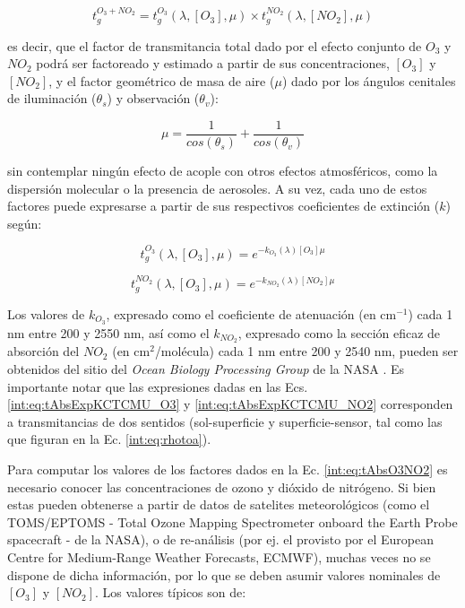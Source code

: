     \begin{equation}
        t_{g}^{O_{3} + NO_{2}} = t_{g}^{O_{3}}(\lambda,[O_{3}],\mu) \times t_{g}^{NO_{2}}(\lambda,[NO_{2}],\mu)
        \label{int:eq:tAbsO3NO2}
    \end{equation}

    \noindent es decir, que el factor de transmitancia total dado por el efecto conjunto de $O_{3}$ y $NO_{2}$ podrá ser factoreado y estimado a partir de sus concentraciones, $[O_{3}]$ y $[NO_{2}]$, y el factor geométrico de masa de aire ($\mu$) dado por los ángulos cenitales de iluminación ($\theta_{s}$) y observación ($\theta_{v}$):
    
    \begin{equation}
        \mu = \frac{1}{cos(\theta_{s})} + \frac{1}{cos(\theta_{v})}
        \label{int:eq:mu}
    \end{equation}

    \noindent sin contemplar ningún efecto de acople con otros efectos atmosféricos, como la dispersión molecular o la presencia de aerosoles. A su vez, cada uno de estos factores puede expresarse a partir de sus respectivos coeficientes de extinción ($k$) según:

    \begin{equation}
        t_{g}^{O_{3} }(\lambda,[O_{3}],\mu) = e^{-k_{O_{3} }(\lambda)[O_{3} ]\mu}
        \label{int:eq:tAbsExpKCTCMU_O3}
    \end{equation}

    \begin{equation}
        t_{g}^{NO_{2}}(\lambda,[O_{3}],\mu) = e^{-k_{NO_{2}}(\lambda)[NO_{2}]\mu}
        \label{int:eq:tAbsExpKCTCMU_NO2}
    \end{equation}
    
    Los valores de $k_{O_{3}}$, expresado como el coeficiente de atenuación (en cm$^{-1}$) cada 1 nm entre 200 y 2550 nm, así como el $k_{NO_{2}}$, expresado como la sección eficaz de absorción del $NO_{2}$ (en cm$^{2}$/molécula) cada 1 nm entre 200 y 2540 nm, pueden ser obtenidos del sitio del \textit{Ocean Biology Processing Group} de la NASA \cite{obpg}. Es importante notar que las expresiones dadas en las Ecs. \ref{int:eq:tAbsExpKCTCMU_O3} y \ref{int:eq:tAbsExpKCTCMU_NO2} corresponden a transmitancias de dos sentidos (sol-superficie y superficie-sensor, tal como las que figuran en la Ec. \ref{int:eq:rhotoa}).
    
    Para computar los valores de los factores dados en la Ec. \ref{int:eq:tAbsO3NO2} es necesario conocer las concentraciones de ozono y dióxido de nitrógeno. Si bien estas pueden obtenerse a partir de datos de satelites meteorológicos (como el TOMS/EPTOMS - Total Ozone Mapping Spectrometer onboard the Earth Probe spacecraft - de la NASA), o de re-análisis (por ej. el provisto por el European Centre for Medium-Range Weather Forecasts, ECMWF), muchas veces no se dispone de dicha información, por lo que se deben asumir valores nominales de $[O_{3}]$ y $[NO_{2}]$. Los valores típicos son de:

